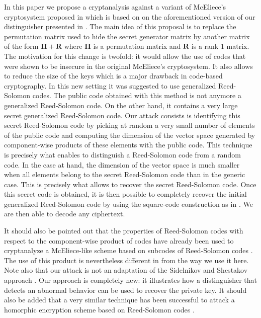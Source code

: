 \documentclass[runningheads,11pt]{llncs}
\newcommand{\mat}[1]{\ensuremath{\boldsymbol{#1}}}
\newcommand{\Pim}{\mat{\Pi}}
\newcommand{\Rm}{\mat{R}}
\begin{document}
\medskip





In this paper we propose a cryptanalysis against 
a variant of McEliece's cryptosystem \cite{McEliece78} proposed  in \cite{BBCRS11a} which is based on 
on the aforementioned version of our
distinguisher presented in \cite{MP12a}.
The main idea of this proposal is to replace the permutation matrix used to hide the secret generator matrix by another matrix of the form $ \Pim + \Rm$ 
where $\Pim$ is a permutation matrix and $\Rm$ is a rank $1$ matrix. 
The motivation for this change is twofold: it would allow the use of codes that were shown to be insecure 
in the original McEliece's cryptosystem. It also allows  to reduce the size of the keys which is a major drawback in code-based 
cryptography. In this new setting it was suggested  to use generalized Reed-Solomon codes. The public code obtained 
with this method is not anymore a generalized Reed-Solomon code. On the other hand, it contains a very large secret generalized Reed-Solomon code. Our attack consists is identifying this secret Reed-Solomon code by picking
at random a very small number of elements of the public code and computing the dimension of the vector space
generated by component-wise products of these elements with the public code. This technique is precisely what enables
to distinguish a Reed-Solomon code from a random code. In the case at hand, the dimension of the vector space
is much smaller when all elements belong to the secret Reed-Solomon code than in the generic case. This is precisely
what allows to recover the secret Reed-Solomon code.
 Once this secret code is obtained, it is then possible to completely recover the initial generalized Reed-Solomon code by using the 
square-code construction as in \cite{Wie10}. We are then able to decode any ciphertext.


\medskip


It should also be pointed out that the properties of Reed-Solomon codes with respect to the component-wise product of codes have 
already been used to cryptanalyze a McEliece-like scheme  \cite{BL05} based on subcodes of Reed-Solomon codes
\cite{Wie10}. The use of this product is nevertheless different in
\cite{Wie10} from the way we use it here.
Note also that our attack is not an 
adaptation of  the Sidelnikov and Shestakov approach \cite{SidelShesta92}. 
Our approach is completely new: it illustrates how a distinguisher
that detects an abnormal behavior can be used to recover the private
key. It should also be added that a very similar technique has been successful to attack \cite{GOT:eprint12} a homorphic
encryption scheme based on Reed-Solomon codes \cite{BL12}.
\end{document}
